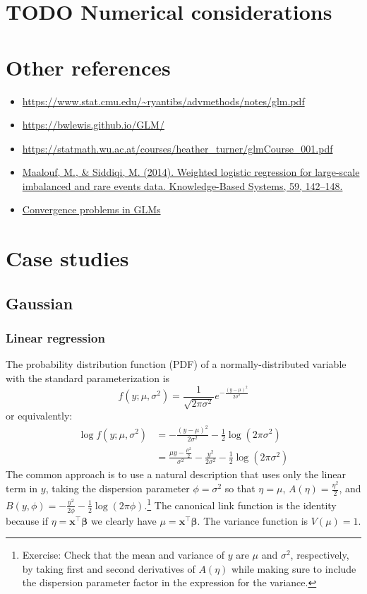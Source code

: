 \documentclass{article}
\newcommand{\bbeta}{\boldsymbol{\beta}}
\begin{document}
\section{TODO Numerical considerations}

\section{Other references}

\begin{itemize}
\item \url{https://www.stat.cmu.edu/~ryantibs/advmethods/notes/glm.pdf}
\item \url{https://bwlewis.github.io/GLM/}
\item \url{https://statmath.wu.ac.at/courses/heather_turner/glmCourse_001.pdf}
\item \href{https://doi.org/10.1016/j.knosys.2014.01.012}{Maalouf, M., \& Siddiqi, M. (2014). Weighted logistic regression for large-scale imbalanced and rare events data. Knowledge-Based Systems, 59, 142–148.}
\item \href{https://journal.r-project.org/archive/2011-2/RJournal_2011-2_Marschner.pdf}{Convergence problems in GLMs}
\end{itemize}

\section{Case studies}

\subsection{Gaussian}

\subsubsection{Linear regression}

The probability distribution function (PDF) of a normally-distributed variable
with the standard parameterization is
\[ f(y; \mu, \sigma^2) = \frac{1}{\sqrt{2\pi\sigma^2}} e^{-\frac{(y - \mu)^2}{2\sigma^2}} \]
or equivalently:
\begin{align}
\log f(y; \mu, \sigma^2) &= -\frac{(y-\mu)^2}{2\sigma^2} - \frac{1}{2} \log (2\pi\sigma^2) \\\
&= \frac{\mu y - \frac{\mu^2}{2}}{\sigma^2} - \frac{y^2}{2\sigma^2} -
\frac{1}{2} \log (2\pi\sigma^2)
\end{align}
The common approach is to use a natural description that uses only the linear
term in \(y\), taking the dispersion parameter \(\phi = \sigma^2\) so that
\(\eta = \mu\), \(A(\eta) = \frac{\eta^2}{2}\), and \(B(y, \phi) =
-\frac{y^2}{2\phi} - \frac{1}{2}\log(2\pi\phi) \).\footnote{
    Exercise: Check that the mean and variance of \(y\) are \(\mu\) and
    \(\sigma^2\), respectively, by taking first and second derivatives of
    \(A(\eta)\) while making sure to include the dispersion parameter factor
    in the expression for the variance.
}
The canonical link function is the identity because if \(\eta =
\mathbf{x}^\intercal\bbeta\) we clearly have \(\mu =
\mathbf{x}^\intercal \bbeta\).
The variance function is \(V(\mu) = 1\).
\end{document}
